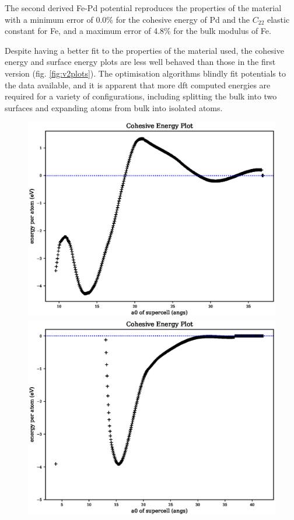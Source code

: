 The second derived Fe-Pd potential reproduces the properties of the material with a minimum error of 0.0\% for the cohesive energy of Pd and the $C_{22}$ elastic constant for Fe, and a maximum error of 4.8\% for the bulk modulus of Fe.

Despite having a better fit to the properties of the material used, the cohesive energy and surface energy plots are less well behaved than those in the first version (fig. \ref{fig:v2plots}).  The optimisation algorithms blindly fit potentials to the data available, and it is apparent that more \acrshort{dft} computed energies are required for a variety of configurations, including splitting the bulk into two surfaces and expanding atoms from bulk into isolated atoms.

\begin{figure}[ht] 
  \centering
  \begin{minipage}[b]{0.4\linewidth}
    \centering
    \includegraphics[width=.98\linewidth]{chapters/potentials_fe_pd_ru/pot_fepd_fcc_2/fe_cohesive_energy.eps} 
  \end{minipage}%
  \begin{minipage}[b]{0.4\linewidth}
    \centering
    \includegraphics[width=.98\linewidth]{chapters/potentials_fe_pd_ru/pot_fepd_fcc_2/pd_cohesive_energy_zoom.eps} 
  \end{minipage}%


\end{figure}
